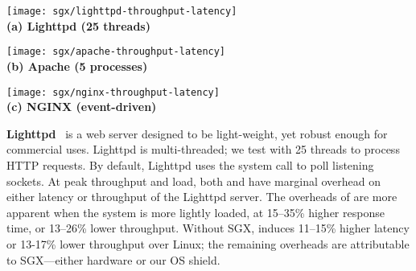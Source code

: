 \begin{figure*}[t!]
	\centering
	
	\begin{minipage}{.45\textwidth}
		\centering
		\footnotesize
		\vspace{6pt}
		\texttt{[image: sgx/lighttpd-throughput-latency]}\\
		\vspace{3pt}
		{\bf (a) Lighttpd (25 threads)}
		\vspace{6pt}
	\end{minipage}
	\begin{minipage}{.45\textwidth}
		\centering
		\footnotesize
		\vspace{6pt}
		\texttt{[image: sgx/apache-throughput-latency]}\\
		\vspace{3pt}
		{\bf (b) Apache (5 processes)}
		\vspace{6pt}
	\end{minipage}
	\begin{minipage}{.45\textwidth}
		\centering
		\footnotesize
		\vspace{6pt}
		\texttt{[image: sgx/nginx-throughput-latency]}\\
		\vspace{3pt}
		{\bf (c) NGINX (event-driven)}
		\vspace{6pt}
	\end{minipage}
	
	\caption{Throughput versus latency of web server workloads, including Lighttpd, Apache, and NGINX, on native Linux, \graphene{}, and \graphenesgx{}.
		We use an ApacheBench client to gradually increase load, and plot
		throughput versus latency at each point.  Lower and further right
		is better.
	}
	\label{fig:server-throughput-latency}
\end{figure*}


{\bf Lighttpd}~\cite{lighttpd} is a web server designed to be light-weight, yet robust enough for commercial uses. 
Lighttpd is multi-threaded; we test with 25 threads to process HTTP requests. 
By default, Lighttpd uses the  system call to poll listening sockets.
At peak throughput and load,  both \graphene{} and \graphenesgx{} have marginal overhead on either latency or throughput of the Lighttpd server.
The overheads of \graphene{} are more apparent when the system
is more lightly loaded, at 
15--35\% higher response time, or 13--26\% lower throughput. 
Without SGX, \graphene{} induces 
11--15\% higher latency or 13-17\% lower throughput over Linux;
the remaining overheads are attributable to SGX---either hardware or our OS shield.

